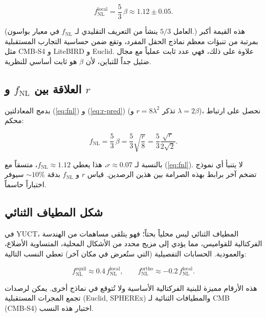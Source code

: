 \documentclass[11pt,a4paper]{article}
\theoremstyle{remark}
\begin{document}
	\begin{equation}
		f_{\text{NL}}^{\text{local}} = \frac{5}{3}\,\beta \approx 1.12 \pm 0.05.
		\label{eq:fnl}
	\end{equation}
	
	(العامل $5/3$ ينشأ من التعريف التقليدي لـ $f_{\text{NL}}$ في معيار بواسون.) هذه القيمة أكبر بمرتبة من تنبؤات معظم نماذج الحقل المفرد، وتقع ضمن حساسية التجارب المستقبلية مثل CMB‑S4 و LiteBIRD و Euclid. علاوة على ذلك، فهي عدد ثابت عملياً مع مجال ضئيل جداً للتباين، لأن $\beta$ هو ثابت أساسي للنظرية.
	
	\subsection{العلاقة بين $f_{\text{NL}}$ و $r$}
	
	بدمج المعادلتين (\ref{eq:fnl}) و (\ref{eq:r-pred}) (تذكر $r = 8\lambda^2$ و $\lambda = 2\beta$)، نحصل على ارتباط محكم:
	
	\begin{equation}
		f_{\text{NL}} = \frac{5}{3}\,\beta = \frac{5}{3}\sqrt{\frac{r}{8}} = \frac{5}{3}\frac{\sqrt{r}}{2\sqrt{2}}.
		\label{eq:fnl-r}
	\end{equation}
	
	بالنسبة لـ $r \approx 0.07$، هذا يعطي $f_{\text{NL}} \approx 1.12$، متسقاً مع (\ref{eq:fnl}). لا يتنبأ أي نموذج تضخم آخر برابط بهذه الصرامة بين هذين الرصدين. قياس $r$ و $f_{\text{NL}}$ بدقة $\sim 10\%$ سيوفر اختباراً حاسماً.
	
	\subsection{شكل المطياف الثنائي}
	
	في YUCT، المطياف الثنائي ليس محلياً بحتاً؛ فهو يتلقى مساهمات من الهندسة الفركتالية للقواميس، مما يؤدي إلى مزيج محدد من الأشكال المحلية، المتساوية الأضلاع، والعمودية. الحسابات التفصيلية (التي ستُعرض في مكان آخر) تعطي النسب التالية:
	
	\begin{equation}
		f_{\text{NL}}^{\text{equil}} \approx 0.4\, f_{\text{NL}}^{\text{local}}, \qquad
		f_{\text{NL}}^{\text{ortho}} \approx -0.2\, f_{\text{NL}}^{\text{local}}.
		\label{eq:fnl-shapes}
	\end{equation}
	
	هذه الأرقام مميزة للبنية الفركتالية الأساسية ولا تُتوقع في نماذج أخرى. يمكن لرصدات تجمع المجرات المستقبلية (Euclid, SPHEREx) والمطيافات الثنائية لـ CMB (CMB‑S4) اختبار هذه النسب.
	
\end{document}
